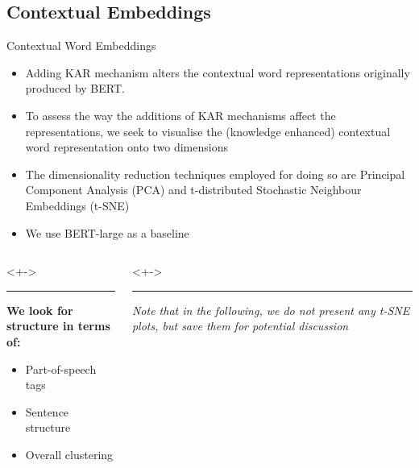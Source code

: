 \subsection{Contextual Embeddings}

\begin{frame}{Contextual Word Embeddings}

{\footnotesize
\begin{itemize}
    \item Adding KAR mechanism alters the contextual word representations originally produced by BERT.
    \item To assess the way the additions of KAR mechanisms affect the representations, we seek to visualise the (knowledge enhanced) contextual word representation onto two dimensions
    \item The dimensionality reduction techniques employed for doing so are Principal Component Analysis (PCA) and t-distributed Stochastic Neighbour Embeddings (t-SNE)
    \item<+-> We use BERT-large as a baseline
\end{itemize}

\begin{columns}
\begin{column}[T]{0.5\textwidth}<+->
{\color{DTU_red}\rule{\textwidth}{2pt}}
\textbf{We look for structure in terms of:}
\begin{itemize}
    \item Part-of-speech tags
    \item Sentence structure
    \item Overall clustering
\end{itemize}
\end{column}
\begin{column}[T]{0.5\textwidth}<+->
{\color{DTU_red}\rule{\textwidth}{2pt}}
\textit{Note that in the following, we do not present any t-SNE plots, but save them for potential discussion}
\end{column}
\end{columns}
}
\end{frame}


